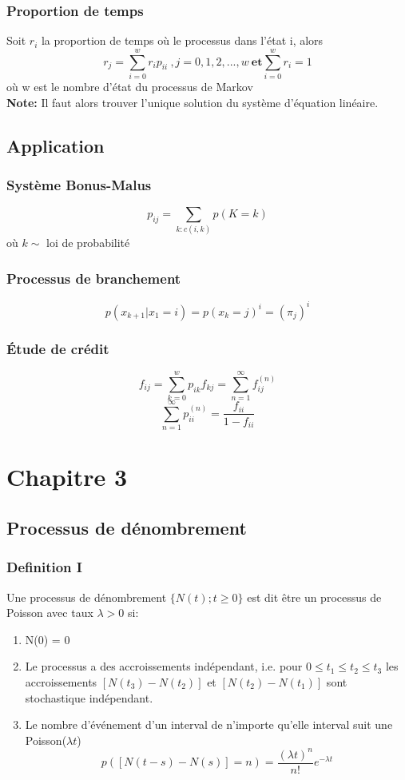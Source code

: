 \documentclass[13pt]{article}
\begin{document}
\subsubsection*{Proportion de temps}
Soit $r_i$ la proportion de temps où le processus dans l'état i, alors 
\[ r_j = \sum_{i=0}^w r_i p_{ii}\:,j=0,1,2,...,w\: \textbf{et} \sum_{i=0}^w r_i = 1 \]
où w est le nombre d'état du processus de Markov \\
\textbf{Note:} Il faut alors trouver l'unique solution du système d'équation linéaire.


\subsection*{Application}

\subsubsection*{Système Bonus-Malus}
\[ p_{ij} = \sum_{k:c(i,k)} p(K = k) \] 
où $k \sim$ loi de probabilité 

\subsubsection*{Processus de branchement}
\[ p(x_{k+1}|x_1 = i) = p(x_k = j)^i = (\pi_j)^i \]


\subsubsection*{Étude de crédit}

\[ f_{ij} = \sum_{k=0}^w p_{ik} f_{kj} = \sum_{n=1}^\infty f_{ij}^{(n)} \]
\[ \sum_{n=1}^\infty p_{ii}^{(n)} = \frac{f_{ii}}{1 - f_{ii}} \]

\section*{Chapitre 3}
\subsection*{Processus de dénombrement}
\subsubsection*{Definition I}
Une processus de dénombrement $\{ N(t);t \geq 0 \}$ est dit être un processus de Poisson avec taux $\lambda > 0$ si:
\begin{enumerate}
  \item N(0) = 0
  \item Le processus a des accroissements indépendant, i.e. pour $0 \leq t_1 \leq t_2 \leq t_3$ les accroissements $[N(t_3) - N(t_2)]$ et $[N(t_2) - N(t_1)]$ 
        sont stochastique indépendant.
  \item Le nombre d'événement d'un interval de n'importe qu'elle interval suit une Poisson($\lambda t$)
        \[ p([N(t-s) - N(s)] = n) = \frac{(\lambda t)^n}{n!} e^{-\lambda t} \]
\end{enumerate}
\end{document}
